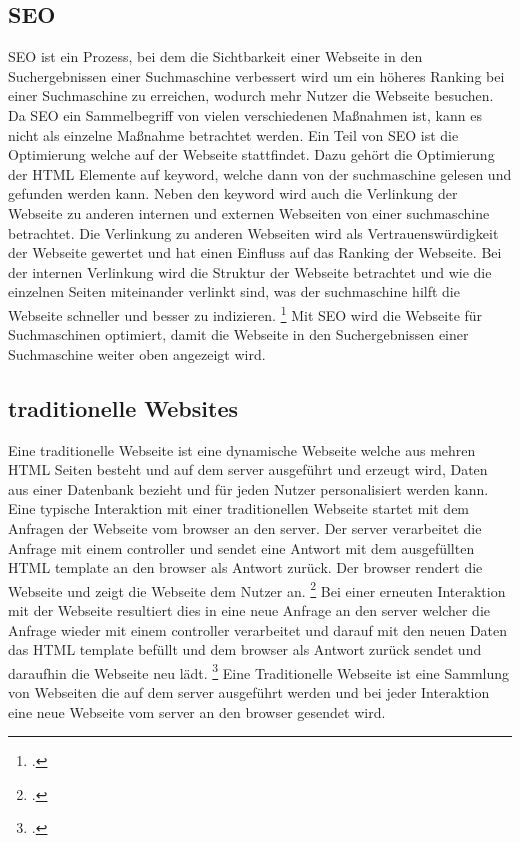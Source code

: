 \subsection{\ac{SEO}}
\ac{SEO} ist ein Prozess, bei dem die Sichtbarkeit einer Webseite in den Suchergebnissen einer Suchmaschine verbessert wird um ein höheres Ranking bei einer Suchmaschine zu erreichen,
wodurch mehr Nutzer die Webseite besuchen.
Da \ac{SEO} ein Sammelbegriff von vielen verschiedenen Maßnahmen ist, kann es nicht als einzelne Maßnahme betrachtet werden.
Ein Teil von \ac{SEO} ist die Optimierung welche auf der Webseite stattfindet.
Dazu gehört die Optimierung der \ac{HTML} Elemente auf \gls{keyword}, welche dann von der \gls{suchmaschine} gelesen und gefunden werden kann.
Neben den \gls{keyword} wird auch die Verlinkung der Webseite zu anderen internen und externen Webseiten von einer \gls{suchmaschine} betrachtet.
Die Verlinkung zu anderen Webseiten wird als Vertrauenswürdigkeit der Webseite gewertet und hat einen Einfluss auf das Ranking der Webseite.
Bei der internen Verlinkung wird die Struktur der Webseite betrachtet und wie die einzelnen Seiten miteinander verlinkt sind, was der \gls{suchmaschine} hilft die Webseite schneller und besser zu indizieren.
\footcite[Vgl.][Seite 5]{John2016}
\newline
Mit \ac{SEO} wird die Webseite für Suchmaschinen optimiert, damit die Webseite in den Suchergebnissen einer Suchmaschine weiter oben angezeigt wird.


\subsection{traditionelle Websites}
Eine traditionelle Webseite ist eine dynamische Webseite welche aus mehren \ac{HTML} Seiten besteht und auf dem \gls{server} ausgeführt und erzeugt wird,
Daten aus einer Datenbank bezieht und für jeden Nutzer personalisiert werden kann.
Eine typische Interaktion mit einer traditionellen Webseite startet mit dem Anfragen der Webseite vom \gls{browser} an den \gls{server}.
Der \gls{server} verarbeitet die Anfrage mit einem \gls{controller} und sendet eine Antwort mit dem ausgefüllten \ac{HTML} \gls{template} an den \gls{browser} als Antwort zurück.
Der \gls{browser} rendert die Webseite und zeigt die Webseite dem Nutzer an. \footcite[Vgl.][Seite 32]{Robbins2018}
Bei einer erneuten Interaktion mit der Webseite resultiert dies in eine neue Anfrage an den \gls{server} welcher die Anfrage wieder mit einem \gls{controller} verarbeitet und darauf mit
den neuen Daten das \ac{HTML} \gls{template} befüllt und dem \gls{browser} als Antwort zurück sendet und daraufhin die Webseite neu lädt. \footcite[Vgl.][Seite 5]{Scott2015}
\newline
Eine Traditionelle Webseite ist eine Sammlung von Webseiten die auf dem \gls{server} ausgeführt werden und bei jeder Interaktion eine neue Webseite vom \gls{server} an den \gls{browser} gesendet wird.

